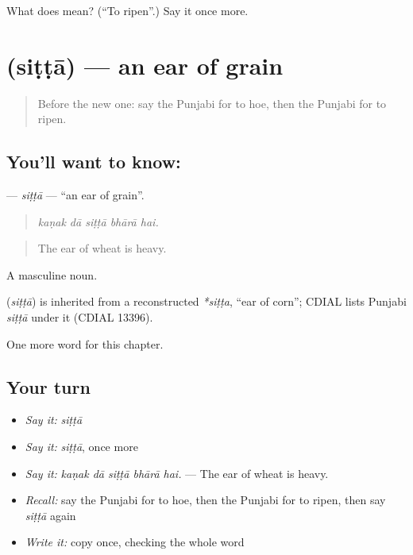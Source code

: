 \begin{tcolorbox}[breakable,colback=teal!4,colframe=teal!35!black,title={Before you move on}]
What does  mean? (\textquotedblleft{}To ripen\textquotedblright{}.) Say it once more.
\end{tcolorbox}
\section[\texorpdfstring{\pa{ਸਿੱਟਾ} (siṭṭā)}{ਸਿੱਟਾ (siṭṭā)}]{ (siṭṭā) — an ear of grain}

\label{lesson:PA-C304-sitta}



\begin{quote}
Before the new one: say the Punjabi for to hoe, then the Punjabi for to ripen.
\end{quote}

\subsection*{You'll want to know: }
\textbf{} — \emph{siṭṭā} — \textquotedblleft{}an ear of grain\textquotedblright{}.

\begin{quote}
    
\end{quote}

\begin{quote}
\emph{kaṇak dā siṭṭā bhārā hai.}
\end{quote}

\begin{quote}
The ear of wheat is heavy.
\end{quote}

A masculine noun.

\begin{cousinweb}
\textbf{} (\emph{siṭṭā}) is inherited from a reconstructed \emph{*siṭṭa}, \textquotedblleft{}ear of corn\textquotedblright{}; CDIAL lists Punjabi \emph{siṭṭā} under it (CDIAL 13396).
\end{cousinweb}

\begin{grammarlens}[title={What you've built}]
One more word for this chapter.
\end{grammarlens}

\subsection*{Your turn}
\begin{itemize}
\raggedright
  \item \emph{Say it:} \emph{siṭṭā}
  \item \emph{Say it:} \emph{siṭṭā}, once more
  \item \emph{Say it:} \emph{kaṇak dā siṭṭā bhārā hai.} — The ear of wheat is heavy.
  \item \emph{Recall:} say the Punjabi for to hoe, then the Punjabi for to ripen, then say \emph{siṭṭā} again
  \item \emph{Write it:} copy \textbf{} once, checking the whole word
\end{itemize}

